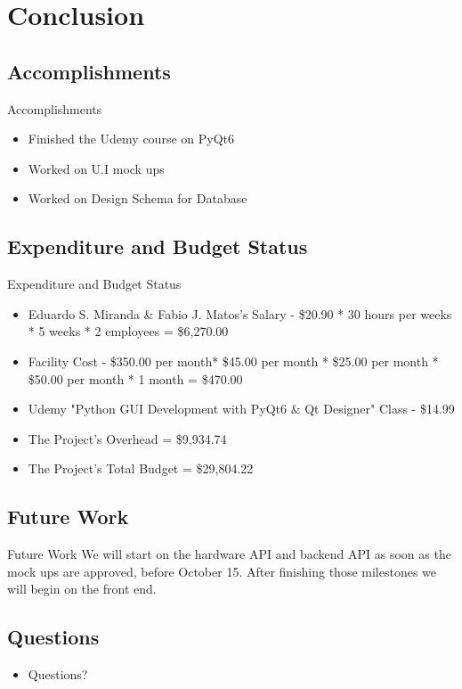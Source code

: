 \documentclass[17pt, aspectratio=169]{beamer}
\begin{document}
\section{Conclusion}
\subsection{Accomplishments}
\begin{frame}{Accomplishments}
	\begin{itemize}
		\item Finished the Udemy course on PyQt6
		\item Worked on U.I mock ups
		\item Worked on Design Schema for Database
	\end{itemize}
\end{frame}
\subsection{Expenditure and Budget Status}
\begin{frame}{Expenditure and Budget Status}
	\begin{itemize}
		\item Eduardo S. Miranda \& Fabio J. Matos's Salary - \$20.90 * 30 hours per weeks * 5 weeks  * 2 employees = \$6,270.00
		\item Facility Cost - \$350.00 per month* \$45.00 per month * \$25.00 per month * \$50.00 per month * 1 month =  \$470.00
		\item Udemy "Python GUI Development with PyQt6 \& Qt Designer" Class - \$14.99
		\item The Project's Overhead = \$9,934.74
		\item The Project's Total Budget = \$29,804.22
	\end{itemize}
\end{frame}
\subsection{Future Work}
\begin{frame}{Future Work}
We will start on the hardware API and backend API as soon as the mock ups are approved, before October 15. After finishing those milestones we will begin on the front end.
\end{frame}
\subsection{Questions}
\begin{frame}
	\begin{itemize}
		\item Questions?
	\end{itemize}
\end{frame}
\end{document}
